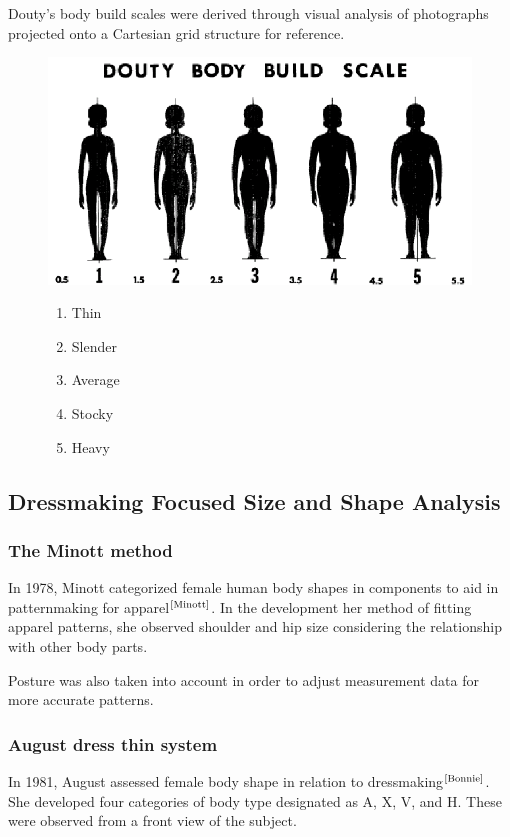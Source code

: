 \documentclass[12pt,a4paper,openany,UKenglish]{scrreprt}
\newcommand{\bib}[1]{$^\text{\cite{#1}}$}
\begin{document}
Douty’s body build scales were derived through visual analysis of photographs projected onto a Cartesian grid structure for reference.
\begin{figure}[H]
	\begin{minipage}{0.75\textwidth}
		\centering
		\includegraphics[width=.7\linewidth]{../Images/douty}
	\end{minipage}\hfill
	\begin{minipage}{0.25\textwidth}
		\begin{enumerate}[nolistsep]
			\item Thin
			\item Slender
			\item Average
			\item Stocky
			\item Heavy
		\end{enumerate}
	\end{minipage}
\end{figure}

\subsection{Dressmaking Focused Size and Shape Analysis}
\subsubsection{The Minott method}
In 1978, Minott categorized female human body shapes in components to aid in patternmaking for apparel\bib{Minott}.
In the development her method of fitting apparel patterns, she observed shoulder and hip size considering the relationship with other body parts.

Posture was also taken into account in order to adjust measurement data for more accurate patterns.

\subsubsection{August dress thin system}
In 1981, August assessed female body shape in relation to dressmaking\bib{Bonnie}.
She developed four categories of body type designated as A, X, V, and H.
These were observed from a front view of the subject.
\end{document}
